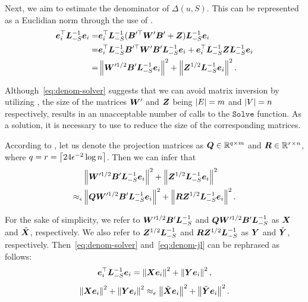 \documentclass[10pt,twocolumn,twoside]{IEEEtran}
\begin{document}
Next, we aim to estimate the denominator of \(\Delta(u,S)\). This can be represented as a Euclidian norm through the use of .
\begin{equation}\label{eq:denom-solver}
    \begin{split}
        \boldsymbol{e}_i^\top\boldsymbol{L}_{-S}^{-1}\boldsymbol{e}_i
        =&\boldsymbol{e}_i^\top\boldsymbol{L}_{-S}^{-1}(\boldsymbol{B}'^\top\boldsymbol{W}'\boldsymbol{B}'+\boldsymbol{Z})\boldsymbol{L}_{-S}^{-1}\boldsymbol{e}_i\\
        =&\boldsymbol{e}_i^\top\boldsymbol{L}_{-S}^{-1}\boldsymbol{B}'^\top\boldsymbol{W}'\boldsymbol{B}'\boldsymbol{L}_{-S}^{-1}\boldsymbol{e}_i+\boldsymbol{e}_i^\top\boldsymbol{L}_{-S}^{-1}\boldsymbol{Z}\boldsymbol{L}_{-S}^{-1}\boldsymbol{e}_i\\
        =&\left\Vert\boldsymbol{W}'^{1/2}\boldsymbol{B}'\boldsymbol{L}_{-S}^{-1}\boldsymbol{e}_i\right\Vert^2+\left\Vert\boldsymbol{Z}^{1/2}\boldsymbol{L}_{-S}^{-1}\boldsymbol{e}_i\right\Vert^2.
    \end{split}
\end{equation}

Although~\eqref{eq:denom-solver} suggests that we can avoid matrix inversion by utilizing , the size of the matrices \(\boldsymbol{W}'\) and \(\boldsymbol{Z}\) being \(\left|E \right|=m\) and \(\left|V \right|=n\) respectively, results in an unacceptable number of calls to the \(\mathtt{Solve}\) function.
As a solution, it is necessary to use  to reduce the size of the corresponding matrices.

According to , let us denote the projection matrices as \(\boldsymbol{Q}\in\mathbb{R}^{q\times m}\) and \(\boldsymbol{R}\in\mathbb{R}^{r\times n}\), where \(q=r=\left\lceil24\epsilon^{-2}\log n\right\rceil\).
Then we can infer that
\begin{equation}\label{eq:denom-jl}
    \begin{split}
        &\left\Vert\boldsymbol{W}'^{1/2}\boldsymbol{B}'\boldsymbol{L}_{-S}^{-1}\boldsymbol{e}_i\right\Vert^2+\left\Vert\boldsymbol{Z}^{1/2}\boldsymbol{L}_{-S}^{-1}\boldsymbol{e}_i\right\Vert^2\\
        \approx_\epsilon&\left\Vert\boldsymbol{Q}\boldsymbol{W}'^{1/2}\boldsymbol{B}'\boldsymbol{L}_{-S}^{-1}\boldsymbol{e}_i\right\Vert^2+\left\Vert\boldsymbol{R}\boldsymbol{Z}^{1/2}\boldsymbol{L}_{-S}^{-1}\boldsymbol{e}_i\right\Vert^2.
    \end{split}
\end{equation}

For the sake of simplicity, we refer to \(\boldsymbol{W}'^{1/2}\boldsymbol{B}'\boldsymbol{L}_{-S}^{-1}\) and \(\boldsymbol{Q}\boldsymbol{W}'^{1/2}\boldsymbol{B}'\boldsymbol{L}_{-S}^{-1}\) as \(\boldsymbol{X}\) and \(\tilde{\boldsymbol{X}}\), respectively.
We also refer to \(\boldsymbol{Z}^{1/2}\boldsymbol{L}_{-S}^{-1}\) and \(\boldsymbol{R}\boldsymbol{Z}^{1/2}\boldsymbol{L}_{-S}^{-1}\) as \(\boldsymbol{Y}\) and \(\tilde{\boldsymbol{Y}}\), respectively.
Then~\eqref{eq:denom-solver} and~\eqref{eq:denom-jl} can be rephrased as follows:
\begin{equation}\label{eq:denom-solver-simp}
    \boldsymbol{e}_i^\top\boldsymbol{L}_{-S}^{-1}\boldsymbol{e}_i=\left\Vert\boldsymbol{X}\boldsymbol{e}_i\right\Vert^2+\left\Vert\boldsymbol{Y}\boldsymbol{e}_i\right\Vert^2,
\end{equation}
\begin{equation}\label{eq:denom-jl-simp}
    \left\Vert\boldsymbol{X}\boldsymbol{e}_i\right\Vert^2+\left\Vert\boldsymbol{Y}\boldsymbol{e}_i\right\Vert^2\approx_\epsilon\left\Vert\tilde{\boldsymbol{X}}\boldsymbol{e}_i\right\Vert^2+\left\Vert\tilde{\boldsymbol{Y}}\boldsymbol{e}_i\right\Vert^2.
\end{equation}
\end{document}
